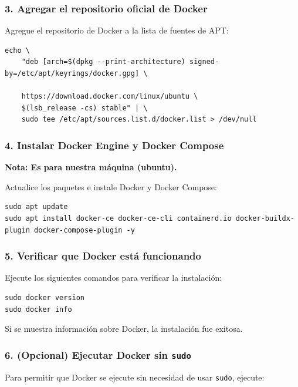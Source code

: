 \subsubsection{3. Agregar el repositorio oficial de Docker}

Agregue el repositorio de Docker a la lista de fuentes de APT:

\begin{lstlisting}[style=customstyle]
echo \
    "deb [arch=$(dpkg --print-architecture) signed-by=/etc/apt/keyrings/docker.gpg] \

    https://download.docker.com/linux/ubuntu \
    $(lsb_release -cs) stable" | \
    sudo tee /etc/apt/sources.list.d/docker.list > /dev/null
\end{lstlisting}

\subsubsection{4. Instalar Docker Engine y Docker Compose}

\textbf{Nota: Es para nuestra máquina (ubuntu).}

Actualice los paquetes e instale Docker y Docker Compose:

\begin{lstlisting}[style=customstyle]
sudo apt update
sudo apt install docker-ce docker-ce-cli containerd.io docker-buildx-plugin docker-compose-plugin -y
\end{lstlisting}

\subsubsection{5. Verificar que Docker está funcionando}

Ejecute los siguientes comandos para verificar la instalación:

\begin{lstlisting}[style=customstyle]
sudo docker version
sudo docker info
\end{lstlisting}

Si se muestra información sobre Docker, la instalación fue exitosa.

\subsubsection{6. (Opcional) Ejecutar Docker sin \texttt{sudo}}

Para permitir que Docker se ejecute sin necesidad de usar \texttt{sudo}, ejecute:


